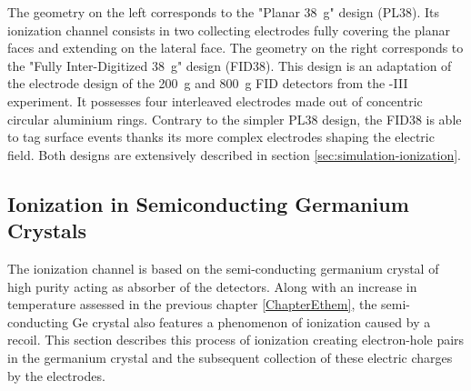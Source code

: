 The geometry on the left corresponds to the "Planar \SI{38}{\g}" design (PL38). Its ionization channel consists in two collecting electrodes fully covering the planar faces and extending on the lateral face.
The geometry on the right corresponds to the "Fully Inter-Digitized \SI{38}{\g}" design (FID38). This design is an adaptation of the electrode design of the \SI{200}{\g} and \SI{800}{\g} FID detectors from the \Edelweiss{}-III experiment. It possesses four interleaved electrodes made out of concentric circular aluminium rings. Contrary to the simpler PL38 design, the FID38 is able to tag surface events thanks its more complex electrodes shaping the electric field. Both designs are extensively described in section \ref{sec:simulation-ionization}.


\subsection{Ionization in Semiconducting Germanium Crystals}
\label{par:ionization-process}



The ionization channel is based on the semi-conducting germanium crystal of high purity acting as absorber of the detectors. Along with an increase in temperature assessed in the previous chapter \ref{ChapterEthem}, the semi-conducting Ge crystal also features a phenomenon of ionization caused by a recoil. This section describes this process of ionization creating electron-hole pairs in the germanium crystal and the subsequent collection of these electric charges by the electrodes.

